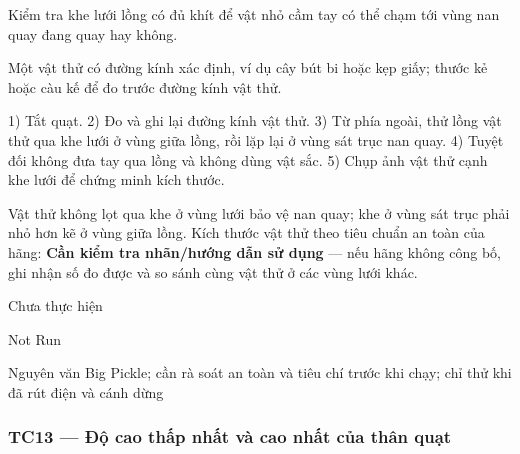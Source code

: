 \begin{description}
\tightlist
\item[Objective]
Kiểm tra khe lưới lồng có đủ khít để vật nhỏ cầm tay có thể chạm tới vùng nan quay đang quay hay không.
\item[Input]
Một vật thử có đường kính xác định, ví dụ cây bút bi hoặc kẹp giấy; thước kẻ hoặc càu kế để đo trước đường kính vật thử.
\item[Steps]
1) Tắt quạt. 2) Đo và ghi lại đường kính vật thử. 3) Từ phía ngoài, thử lồng vật thử qua khe lưới ở vùng giữa lồng, rồi lặp lại ở vùng sát trục nan quay. 4) Tuyệt đối không đưa tay qua lồng và không dùng vật sắc. 5) Chụp ảnh vật thử cạnh khe lưới để chứng minh kích thước.
\item[Expected]
Vật thử không lọt qua khe ở vùng lưới bảo vệ nan quay; khe ở vùng sát trục phải nhỏ hơn kẽ ở vùng giữa lồng. Kích thước vật thử theo tiêu chuẩn an toàn của hãng: \textbf{Cần kiểm tra nhãn/hướng dẫn sử dụng} --- nếu hãng không công bố, ghi nhận số đo được và so sánh cùng vật thử ở các vùng lưới khác.
\item[Actual]
Chưa thực hiện
\item[Verdict]
Not Run
\item[Ghi chú rà soát]
Nguyên văn Big Pickle; cần rà soát an toàn và tiêu chí trước khi chạy; chỉ thử khi đã rút điện và cánh dừng
\end{description}

\subsubsection{TC13 --- Độ cao thấp nhất và cao nhất của thân quạt}\label{tc13-ux111ux1ed9-cao-thux1ea5p-nhux1ea5t-vuxe0-cao-nhux1ea5t-cux1ee7a-thuxe2n-quux1ea1t}

